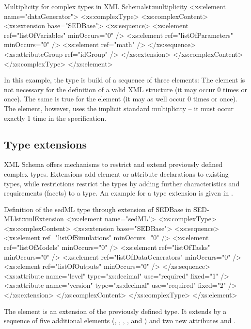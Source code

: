 \begin{myXmlLst}{Multiplicity for complex types in XML Schema}{lst:multiplicity}
<xs:element name="dataGenerator">
	<xs:complexType>
		<xs:complexContent>
			<xs:extension base="SEDBase">
				<xs:sequence>
					<xs:element ref="listOfVariables" minOccurs="0" />
					<xs:element ref="listOfParameters" minOccurs="0" />
					<xs:element ref="math" />
				</xs:sequence>
				<xs:attributeGroup ref="idGroup" />
			</xs:extension>
		</xs:complexContent>
	</xs:complexType>
</xs:element>
\end{myXmlLst}

In this example, the  type is build of a sequence of three elements: The  element is not necessary for the definition of a valid  XML structure (it may occur 0 times or once). The same is true for the  element (it may as well occur 0 times or once). The  element, however, uses the implicit standard multiplicity -- it must occur exactly 1 time in the  specification.

\subsection{Type extensions}
XML Schema offers mechanisms to restrict and extend previously defined complex types. Extensions add element or attribute declarations to existing types, while restrictions restrict the types by adding further characteristics and requirements (facets) to a type. An example for a type extension is given in .

\begin{myXmlLst}{Definition of the sedML type through extension of SEDBase in SED-ML}{lst:xmlExtension}
	<xs:element name="sedML">
		<xs:complexType>
			<xs:complexContent>
				<xs:extension base="SEDBase">
					<xs:sequence>
						<xs:element ref="listOfSimulations" minOccurs="0" />
						<xs:element ref="listOfModels" minOccurs="0" />
						<xs:element ref="listOfTasks" minOccurs="0" />
						<xs:element ref="listOfDataGenerators" minOccurs="0" />
						<xs:element ref="listOfOutputs" minOccurs="0" />
					</xs:sequence>
					<xs:attribute name="level" type="xs:decimal" use="required"
						fixed="1" />
					<xs:attribute name="version" type="xs:decimal" use="required"
						fixed="2" />
				</xs:extension>
			</xs:complexContent>
		</xs:complexType>
	</xs:element>
\end{myXmlLst}

The  element is an extension of the previously defined  type. It extends  by a sequence of five additional elements (, , , , and ) and two new attributes  and .
